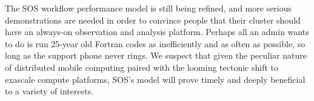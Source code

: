 The SOS workflow performance model is still being refined, and more
serious demonstrations are needed in order to convince people that
their cluster should have an always-on observation and analysis
platform.
%
Perhaps all an admin wants to do is run 25-year old Fortran codes as
inefficiently and as often as possible, so long as the support phone
never rings.
%
We suspect that given the peculiar nature of distributed mobile
computing paired with the looming tectonic shift to exascale compute
platforms, SOS's model will prove timely and deeply beneficial to a
variety of interests.

